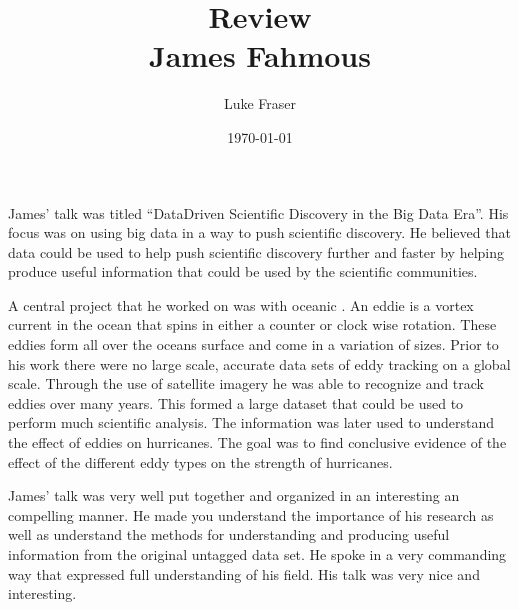 \documentclass{article}
\begin{document}
\title{{\large Review} \\ James Fahmous}
\author{Luke Fraser}
\date{\today}
\maketitle

\begingroup
\renewcommand{\section}[2]{}


\endgroup

\section*{Summary}
James' talk was titled ``Data­Driven Scientific Discovery in the Big Data Era''. His focus was on using big data in a way to push scientific discovery. He believed that data could be used to help push scientific discovery further and faster by helping produce useful information that could be used by the scientific communities.

A central project that he worked on was with oceanic . An eddie is a vortex current in the ocean that spins in either a counter or clock wise rotation. These eddies form all over the oceans surface and come in a variation of sizes. Prior to his work there were no large scale, accurate data sets of eddy tracking on a global scale. Through the use of satellite imagery he was able to recognize and track eddies over many years. This formed a large dataset that could be used to perform much scientific analysis. The information was later used to understand the effect of eddies on hurricanes. The goal was to find conclusive evidence of the effect of the different eddy types on the strength of hurricanes.

\section*{Strengths}
James' talk was very well put together and organized in an interesting an compelling manner. He made you understand the importance of his research as well as understand the methods for understanding and producing useful information from the original untagged data set. He spoke in a very commanding way that expressed full understanding of his field. His talk was very nice and interesting.
\end{document}
